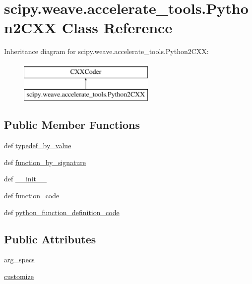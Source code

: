 \hypertarget{classscipy_1_1weave_1_1accelerate__tools_1_1Python2CXX}{}\section{scipy.\+weave.\+accelerate\+\_\+tools.\+Python2\+C\+X\+X Class Reference}
\label{classscipy_1_1weave_1_1accelerate__tools_1_1Python2CXX}
Inheritance diagram for scipy.\+weave.\+accelerate\+\_\+tools.\+Python2\+C\+X\+X\+:\begin{figure}[H]
\begin{center}
\leavevmode
\includegraphics[height=2.000000cm]{classscipy_1_1weave_1_1accelerate__tools_1_1Python2CXX}
\end{center}
\end{figure}
\subsection*{Public Member Functions}
\begin{DoxyCompactItemize}
\item 
def \hyperlink{classscipy_1_1weave_1_1accelerate__tools_1_1Python2CXX_a265cd7177b296c172761661938984fae}{typedef\+\_\+by\+\_\+value}
\item 
def \hyperlink{classscipy_1_1weave_1_1accelerate__tools_1_1Python2CXX_a1e965b9f1730b9ea237f4feee771c21d}{function\+\_\+by\+\_\+signature}
\item 
def \hyperlink{classscipy_1_1weave_1_1accelerate__tools_1_1Python2CXX_a83abed850b49accf033ab2239ee0aea5}{\+\_\+\+\_\+init\+\_\+\+\_\+}
\item 
def \hyperlink{classscipy_1_1weave_1_1accelerate__tools_1_1Python2CXX_af07ffb0b325e73646885929b5939589d}{function\+\_\+code}
\item 
def \hyperlink{classscipy_1_1weave_1_1accelerate__tools_1_1Python2CXX_aea3ec644b69b6566bd55c0d7a7e35556}{python\+\_\+function\+\_\+definition\+\_\+code}
\end{DoxyCompactItemize}
\subsection*{Public Attributes}
\begin{DoxyCompactItemize}
\item 
\hyperlink{classscipy_1_1weave_1_1accelerate__tools_1_1Python2CXX_a1cd4c95212047c7886a744a5d5539807}{arg\+\_\+specs}
\item 
\hyperlink{classscipy_1_1weave_1_1accelerate__tools_1_1Python2CXX_ac193e423c8f862a6732267d08e894777}{customize}
\end{DoxyCompactItemize}


